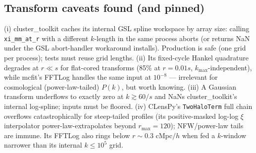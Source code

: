 \subsection{Transform caveats found (and pinned)}

(i) cluster\_toolkit caches its internal GSL spline workspace by array
size: calling \texttt{xi\_mm\_at\_r} with a different $k$-length in the
same process aborts (or returns NaN under the GSL abort-handler
workaround  installs). Production is
safe (one grid per process); tests must reuse grid lengths.
(ii) Its fixed-cycle Hankel quadrature degrades at $r \ll s$ for
flat-cored transforms (85\% at $r = 0.01s$, $k_{\max}$-independent),
while mcfit's FFTLog handles the same input at $10^{-8}$ --- irrelevant
for cosmological (power-law-tailed) $P(k)$, but worth knowing.
(iii) A Gaussian transform underflows to exactly zero at
$k \gtrsim 60/s$ and NaNs cluster\_toolkit's internal log-spline;
inputs must be floored.
(iv) CLensPy's \texttt{TwoHaloTerm} full chain overflows
catastrophically for steep-tailed profiles (its positive-masked
log-log $\xi$ interpolator power-law-extrapolates beyond
$r_{\max} = 120$); NFW/power-law tails are immune. Its FFTLog also
rings below $r \sim 0.3$ cMpc$/h$ when fed a $k$-window narrower than
its internal $k \le 10^{5}$ grid.
